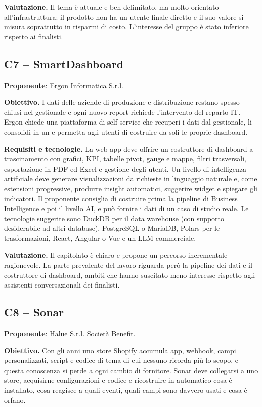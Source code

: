 \textbf{Valutazione.} Il tema è attuale e ben delimitato, ma molto
orientato all'infrastruttura: il prodotto non ha un utente finale diretto
e il suo valore si misura soprattutto in risparmi di costo. L'interesse
del gruppo è stato inferiore rispetto ai finalisti.

\subsection{C7 -- SmartDashboard}
\textbf{Proponente}: Ergon Informatica S.r.l.

\textbf{Obiettivo.} I dati delle aziende di produzione e distribuzione
restano spesso chiusi nel gestionale e ogni nuovo report richiede
l'intervento del reparto IT. Ergon chiede una piattaforma di
 self-service che recuperi i dati dal
gestionale, li consolidi in un  e permetta agli utenti
di costruire da soli le proprie dashboard.

\textbf{Requisiti e tecnologie.} La web app deve offrire un costruttore di
dashboard a trascinamento con grafici, KPI, tabelle pivot, gauge e mappe,
filtri trasversali, esportazione in PDF ed Excel e gestione degli utenti.
Un livello di intelligenza artificiale deve generare visualizzazioni da
richieste in linguaggio naturale e, come estensioni progressive, produrre
insight automatici, suggerire widget e spiegare gli indicatori. Il
proponente consiglia di costruire prima la pipeline di Business
Intelligence e poi il livello AI, e può fornire i dati di un caso di studio
reale. Le tecnologie suggerite sono DuckDB per il data warehouse (con
supporto desiderabile ad altri database), PostgreSQL o MariaDB, Polars per
le trasformazioni, React, Angular o Vue e un LLM commerciale.

\textbf{Valutazione.} Il capitolato è chiaro e propone un percorso
incrementale ragionevole. La parte prevalente del lavoro riguarda però la
pipeline dei dati e il costruttore di dashboard, ambiti che hanno
suscitato meno interesse rispetto agli assistenti conversazionali dei
finalisti.

\subsection{C8 -- Sonar}
\textbf{Proponente}: Halue S.r.l. Società Benefit.

\textbf{Obiettivo.} Con gli anni uno store Shopify accumula app, webhook,
campi personalizzati, script e codice di tema di cui nessuno ricorda più
lo scopo, e questa conoscenza si perde a ogni cambio di fornitore. Sonar
deve collegarsi a uno store, acquisirne configurazioni e codice e
ricostruire in automatico cosa è installato, cosa reagisce a quali
eventi, quali campi sono davvero usati e cosa è orfano.

